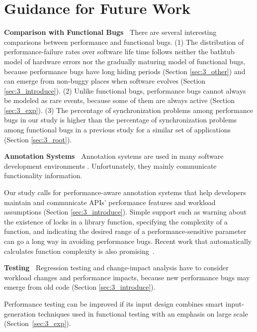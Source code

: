 \section{Guidance for Future Work}

{\bf Comparison with Functional Bugs\ }
There are several interesting comparisons between performance and functional
bugs. (1)
The distribution of performance-failure rates over software life time
follows neither the bathtub model of
hardware errors nor the gradually maturing model of functional bugs, because
performance bugs have long hiding periods (Section \ref{sec:3_other}) 
and can emerge from non-buggy 
places when software evolves (Section \ref{sec:3_introduce}).
(2) Unlike functional bugs, performance bugs cannot always be modeled as 
rare events, because some of them are always active 
(Section \ref{sec:3_exp}).
(3) The percentage of synchronization problems among
performance bugs in our study is higher than the percentage of synchronization
problems among functional bugs in a previous study for
a similar set of applications~\citep{LiASID06} (Section \ref{sec:3_root}).

{\bf Annotation Systems\ }
Annotation systems are used in many software development environments
\citep{msdnannot,linuxannot}. Unfortunately, they mainly communicate
functionality information.%

Our study calls for performance-aware annotation systems
\citep{perfassert1,perfassert2}
that help developers maintain and communicate APIs' performance features
and workload assumptions (Section \ref{sec:3_introduce}).
Simple support such as warning about the existence of locks in
a library function, specifying the complexity of a function, and
indicating the desired range of a performance-sensitive parameter
can go a long way in avoiding performance bugs.
Recent work that automatically calculates function complexity is
also promising~\citep{gulwani.popl2009}.

{\bf Testing\ }
Regression testing and change-impact analysis have to
consider workload changes and performance impacts, because new performance bugs
may emerge from old code
(Section \ref{sec:3_introduce}).

Performance testing can be improved if its input
design combines smart input-generation techniques used in functional testing
\citep{KLEE, dart} with an emphasis on large scale
(Section~\ref{sec:3_exp}).

